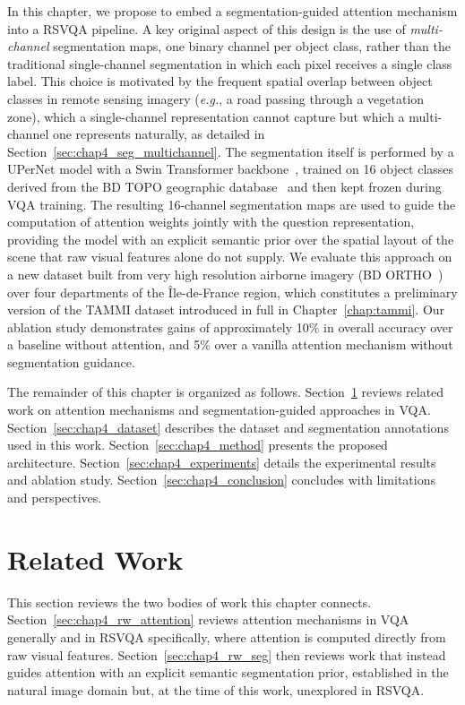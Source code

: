 In this chapter, we propose to embed a segmentation-guided
attention mechanism into a RSVQA pipeline. A key original
aspect of this design is the use of \textit{multi-channel}
segmentation maps, one binary channel per object class,
rather than the traditional single-channel segmentation in
which each pixel receives a single class label. This choice
is motivated by the frequent spatial overlap between object
classes in remote sensing imagery (\textit{e.g.}, a road
passing through a vegetation zone), which a single-channel
representation cannot capture but which a multi-channel one
represents naturally, as detailed in
Section~\ref{sec:chap4_seg_multichannel}. The segmentation
itself is performed by a UPerNet model with a Swin
Transformer backbone~\cite{liu2021swin}, trained on 16
object classes derived from the BD TOPO geographic
database~\cite{bdtopo} and then kept frozen during VQA
training. The resulting 16-channel segmentation maps are
used to guide the computation of attention weights jointly
with the question representation, providing the model with
an explicit semantic prior over the spatial
layout of the scene that raw visual features alone do not
supply. We evaluate this approach on a new
dataset built from very high resolution airborne imagery
(BD ORTHO~\cite{bdortho}) over four
departments of the Île-de-France region, which constitutes
a preliminary version of the TAMMI dataset introduced in
full in Chapter~\ref{chap:tammi}. Our ablation study
demonstrates gains of approximately 10\% in overall
accuracy over a baseline without attention, and 5\% over
a vanilla attention mechanism without segmentation guidance.

The remainder of this chapter is organized as follows.
Section~\ref{sec:chap4_rw} reviews related work on
attention mechanisms and segmentation-guided approaches
in VQA. Section~\ref{sec:chap4_dataset} describes the
dataset and segmentation annotations used in this work.
Section~\ref{sec:chap4_method} presents the proposed
architecture. Section~\ref{sec:chap4_experiments} details
the experimental results and ablation study.
Section~\ref{sec:chap4_conclusion} concludes with
limitations and perspectives.

\section{Related Work}
\label{sec:chap4_rw}
This section reviews the two bodies of work this chapter connects. 
Section~\ref{sec:chap4_rw_attention} reviews attention mechanisms 
in VQA generally and in RSVQA specifically, where attention is computed 
directly from raw visual features. Section~\ref{sec:chap4_rw_seg} then reviews work that instead guides attention with an explicit 
semantic segmentation prior, established in the natural image domain but, at the time of this work, unexplored in RSVQA.
